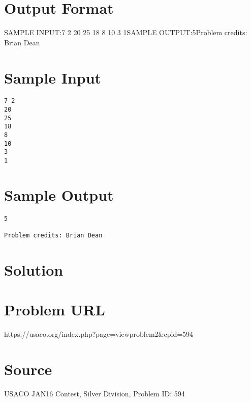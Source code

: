 \documentclass[12pt]{article}
\begin{document}
\section*{Output Format}
SAMPLE INPUT:7 2
20
25
18
8
10
3
1SAMPLE OUTPUT:5Problem credits: Brian Dean

\section*{Sample Input}
\begin{verbatim}
7 2
20
25
18
8
10
3
1
\end{verbatim}

\section*{Sample Output}
\begin{verbatim}
5

Problem credits: Brian Dean
\end{verbatim}

\section*{Solution}


\section*{Problem URL}
https://usaco.org/index.php?page=viewproblem2&cpid=594

\section*{Source}
USACO JAN16 Contest, Silver Division, Problem ID: 594
\end{document}
